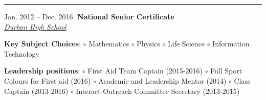 \documentclass[10pt,a4paper,ragged2e,withhyper]{altacv}
\newcommand{\MyVerticalRule}{
		\textcolor{ColorOne}
		{
		  \rule
		  	{1pt}
		  	{\textheight}
		}
	}
\newcommand{\MySkip} {
		\vskip 
		12pt
	}
\newcommand{\myhref}[2]{
		\href{#1}
		{\textcolor{ColorTwo}{#2}}
	}
\begin{document}
\begin{adjustbox}{valign=t}
\begin{minipage}{0.3\textwidth}
\begin{description}
            \end{description}  

        
            \vfill
    \end{minipage} 
    \end{adjustbox}
    \begin{adjustbox}{valign=t}
        \begin{minipage}{0.05\textwidth} %
        \MyVerticalRule  
        \end{minipage}
    \end{adjustbox} 
    \begin{adjustbox}{valign=t}
        \begin{minipage}{0.6\textwidth}
            
            \MySkip
            \textcolor{ColorOne}{Jan. 2012 -- Dec. 2016.} \newline
                    	{\textbf{National Senior Certificate}}\\ \medskip 
                    	\textit{\myhref{https://www.durbanhighschool.co.za/}{Durban High School}     }\\ 
                    	\begin{description}
                         {\textbf{Key Subject Choices}:}\hfill\break
                                \textcolor{ColorOne}{$\circ$}  Mathematics\hfill\break
                                \textcolor{ColorOne}{$\circ$}  Physics\hfill\break
                                \textcolor{ColorOne}{$\circ$}  Life Science\hfill\break
                                \textcolor{ColorOne}{$\circ$}  Information Technology\hfill\break  
                         
            {\textbf{Leadership positions}:}\hfill\break
                                \textcolor{ColorOne}{$\circ$}  First Aid Team Captain (2015-2016)\hfill\break
                                \textcolor{ColorOne}{$\circ$}  Full Sport Colours for First aid (2016)\hfill\break
                                \textcolor{ColorOne}{$\circ$}  Academic and Leadership Mentor (2014)\hfill\break
                                \textcolor{ColorOne}{$\circ$}  Class Captain (2013-2016)\hfill\break
                                \textcolor{ColorOne}{$\circ$}  Interact Outreach Committee Secretary (2013-2015)\hfill\break
                             \end{description}
                             

\end{minipage}
\end{adjustbox}
\end{document}
